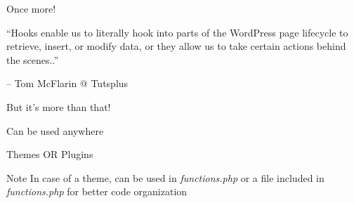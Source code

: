 \documentclass[10pt]{beamer}
\begin{document}
    \begin{frame}{Once more!}
        \begin{large}
            ``Hooks enable us to literally hook into parts of the WordPress page lifecycle to retrieve, insert, or modify data, or they allow us to take certain actions behind the scenes..''
        \end{large}
        \begin{flushright}
            -- Tom McFlarin @ Tutsplus
        \end{flushright}
    \end{frame}

    \begin{frame}
        \begin{center}
            \begin{Huge}
                But it's more than that!
            \end{Huge}
            \vfill{}

            Can be used anywhere
            \vfill{}
            \begin{Huge}
                Themes OR Plugins
            \end{Huge}

            \vfill{}
            \begin{block}{Note}
                In case of a theme, can be used in \emph{functions.php} or a file included in \emph{functions.php} for better code organization
            \end{block}
        \end{center}
    \end{frame}
\end{document}
